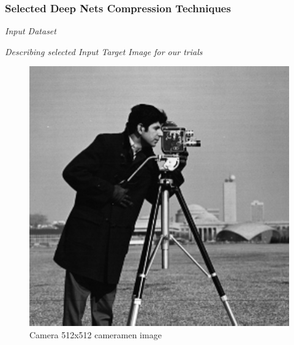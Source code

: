 

\begin{frame}
    \frametitle{Selected Deep Nets Compression Techniques}
        \begin{center}
            {\fontsize{40}{50}\selectfont \emph{Input Dataset}}
        \end{center}
        \begin{center}
            \emph{Describing selected Input Target Image for our trials}
        \end{center}
        \begin{figure}
            \includegraphics[scale=0.2]{slides/experiments/target-image/images/cameramen_512x512.png}
            \caption{Camera 512x512 cameramen image}
        \end{figure}
\end{frame}

